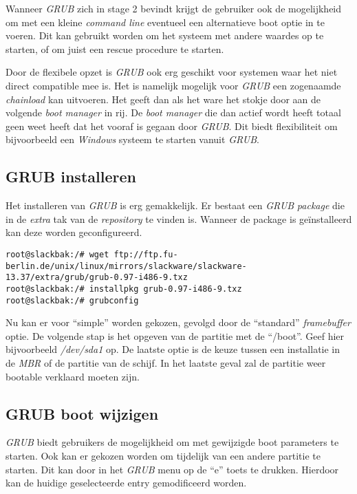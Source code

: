 Wanneer \emph{GRUB} zich in stage 2 bevindt krijgt de gebruiker ook de mogelijkheid om met een kleine \emph{command line} eventueel een alternatieve boot optie in te voeren. Dit kan gebruikt worden om het systeem met andere waardes op te starten, of om juist een rescue procedure te starten. 

Door de flexibele opzet is \emph{GRUB} ook erg geschikt voor systemen waar het niet direct compatible mee is. Het is namelijk mogelijk voor \emph{GRUB} een zogenaamde \emph{chainload} kan uitvoeren. Het geeft dan als het ware het stokje door aan de volgende \emph{boot manager} in rij. De \emph{boot manager} die dan actief wordt heeft totaal geen weet heeft dat het vooraf is gegaan door \emph{GRUB}. Dit biedt flexibiliteit om bijvoorbeeld een \emph{Windows} systeem te starten vanuit \emph{GRUB}. 

\subsection{GRUB installeren}\label{grub.boot.install}
Het installeren van \emph{GRUB} is erg gemakkelijk. Er bestaat een \emph{GRUB} \emph{package} die in de \emph{extra} tak van de \emph{repository} te vinden is. Wanneer de package is ge\"{i}nstalleerd kan deze worden geconfigureerd.
\begin{lstlisting}
root@slackbak:/# wget ftp://ftp.fu-berlin.de/unix/linux/mirrors/slackware/slackware-13.37/extra/grub/grub-0.97-i486-9.txz
root@slackbak:/# installpkg grub-0.97-i486-9.txz
root@slackbak:/# grubconfig 
\end{lstlisting}

Nu kan er voor ``simple'' worden gekozen, gevolgd door de ``standard'' \emph{framebuffer} optie. De volgende stap is het opgeven van de partitie met de ``/boot''. Geef hier bijvoorbeeld \emph{/dev/sda1} op. De laatste optie is de keuze tussen een installatie in de \emph{MBR} of de partitie van de schijf. In het laatste geval zal de partitie weer bootable verklaard moeten zijn. 

\subsection{GRUB boot wijzigen}\label{grub.boot.modify}
\emph{GRUB} biedt gebruikers de mogelijkheid om met gewijzigde boot parameters te starten. Ook kan er gekozen worden om tijdelijk van een andere partitie te starten. Dit kan door in het \emph{GRUB} menu op de ``e'' toets te drukken. Hierdoor kan de huidige geselecteerde entry gemodificeerd worden. 

